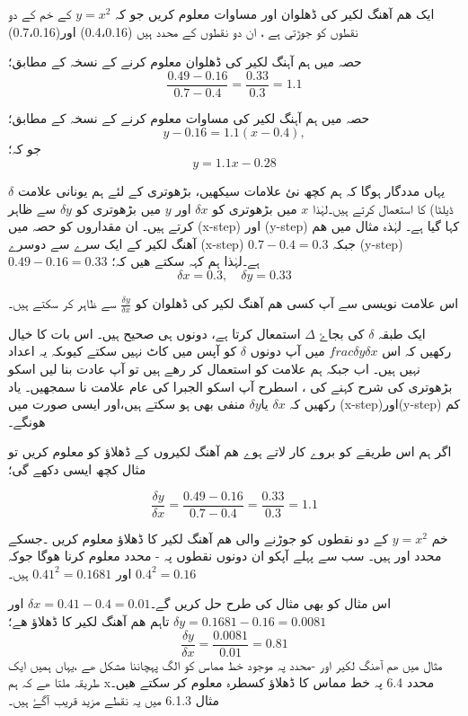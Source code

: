 ایک ھم آھنگ لکیر کی ڈھلوان اور مساوات معلوم کریں جو کہ \( y=x^{2}\) کے خم کے دو نقطوں کو جوڑتی ہے ، ان دو نقطوں کے محدد ہیں (0.4،0.16) اور(0.7،0.16)

حصہ  میں ہم آہنگ لکیر کی ڈھلوان معلوم کرنے کے نسخہ کے مطابق؛
\[ \frac{0.49-0.16}{0.7-0.4} = \frac{0.33}{0.3} = 1.1\]

حصہ  میں ہم آہنگ لکیر کی مساوات معلوم کرنے کے نسخہ کے مطابق؛
\[ y-0.16 = 1.1(x-0.4), \]
جو کہ؛
\[ y=1.1x-0.28\]

 

یہاں مددگار ہوگا کہ ہم کچھ نئ علامات سیکھیں، بڑھوتری کے لئے ہم یونانی علامت \( \delta\)ڈیلٹا) کا استعمال کرتے ہیں۔لہٰذا \(x\)  میں بڑھوتری کو        \(\delta x\)    اور          \(y\)  میں بڑھوتری کو          \(\delta y\) سے ظاہر کرتے ہیں۔ ان مقداروں کو حصہ  میں (x-step) اور (y-step) کہا گیا ہے۔ لہٰذہ مثال  میں ھم آھنگ لکیر کے ایک سرے سے دوسرے (x-step)    \( 0.7-0.4=0.3\) جبکہ (y-step) \(0.49-0.16=0.33\) ہے۔لہٰذا ہم کہہ سکتے ھیں کہ؛
\[ \delta x = 0.3 ,\quad \delta y =0.33\]

اس علامت نویسی سے آپ کسی ھم آھنگ لکیر کی ڈھلوان کو \( \frac{\delta y}{\delta x}\) سے ظاہر کر سکتے ہیں۔ 

ایک طبقہ  \( \delta\) کی بجاۓ                 \( \Delta \)             استمعال کرتا ہے، دونوں ہی صحیح ہیں۔   
اس بات کا خیال رکھیں کہ اس \(frac{\delta y}{\delta x}\) میں آپ دونوں \(\delta\) کو آپس میں کاٹ نہیں سکتے کیوںکہ یہ اعداد نہیں ہیں۔
اب جبکہ ہم علامت کو استعمال کر رھے ہیں تو آپ عادت بنا لیں اسکو بڑھوتری کی شرح کہنے کی ، اسطرح آپ اسکو الجبرا کی عام علامت نا سمجھیں۔ یاد رکھیں کہ \(\delta x\) یا\(\delta y\)  منفی بھی ہو سکتے ہیں،اور ایسی صورت میں (x-step)اور(y-step) کم ھونگے۔
 
اگر ہم اس طریقے کو بروے کار لاتے ہوے ھم آھنگ لکیروں کے ڈھلاؤ کو معلوم کریں تو مثال   کچھ ایسی دکھے گی؛

\[ \frac{\delta y}{\delta x} = \frac{0.49-0.16}{0.7-0.4}=\frac{0.33}{0.3}=1.1 \]

خم \( y=x^{2}\) کے دو نقطوں کو جوڑنے والی ھم آھنگ لکیر کا ڈھلاؤ معلوم کریں ۔جسکے     محدد    اور   ہیں۔
سب سے پہلے آپکو ان دونوں نقطوں پہ   -    
محدد معلوم کرنا ھوگا  جوکہ \( 0.4^{2}=0.16\)  اور \( 0.41^{2} =0.1681\) ہیں۔



 اس مثال کو بھی مثال  کی طرح حل کریں گے۔\( \delta x = 0.41-0.4=0.01\)  اور   \(\delta y =0.1681-0.16=0.0081\)
تاہم ھم آھنگ لکیر کا ڈھلاؤ ھے؛
\[ \frac{\delta y}{\delta x} =\frac{0.0081}{0.01}=0.81\]
مثال   میں  ھم آھنگ لکیر اور -محدد  پہ موجود خط مماس کو الگ پہچاننا  مشکل ھے ،یہاں ہمیں ایک طریقہ ملتا ھے کہ ہم  xمحدد 6.4 پہ خط مماس کا ڈھلاؤ کسطرہ معلوم کر سکتے ھیں۔ 
مثال 6.1.3 میں یہ نقطے مزید قریب آگۓ ہیں۔

